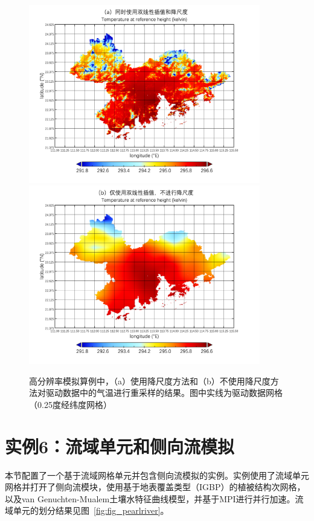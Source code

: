 \begin{figure}[htpb]
    \centering
    \includegraphics[width=0.90\textwidth]{figures/Example05_BilinearDownscaling.pdf}
    \includegraphics[width=0.90\textwidth]{figures/Example05_BilinearOnly.pdf}
    \caption{高分辨率模拟算例中，（a）使用降尺度方法和（b）不使用降尺度方法对驱动数据中的气温进行重采样的结果。图中实线为驱动数据网格（0.25度经纬度网格）}
    \label{fig:fig_hiresdownscaling}
\end{figure}

\section{实例6：流域单元和侧向流模拟}

本节配置了一个基于流域网格单元并包含侧向流模拟的实例。实例使用了流域单元网格并打开了侧向流模块，使用基于地表覆盖类型（IGBP）的植被结构次网格，以及van Genuchten-Mualem土壤水特征曲线模型，并基于MPI进行并行加速。流域单元的划分结果见图~\ref{fig:fig_pearlriver}。

